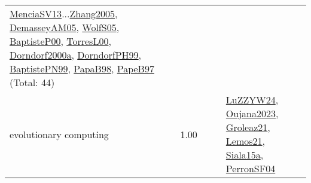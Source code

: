 {\begin{longtable}{p{3cm}r>{\raggedright\arraybackslash}p{6cm}>{\raggedright\arraybackslash}p{6cm}>{\raggedright\arraybackslash}p{8cm}}
\hyperref[detail:MenciaSV13]{MenciaSV13}...\hyperref[detail:Zhang2005]{Zhang2005}, \hyperref[detail:DemasseyAM05]{DemasseyAM05}, \hyperref[detail:WolfS05]{WolfS05}, \hyperref[detail:BaptisteP00]{BaptisteP00}, \hyperref[detail:TorresL00]{TorresL00}, \hyperref[detail:Dorndorf2000a]{Dorndorf2000a}, \hyperref[detail:DorndorfPH99]{DorndorfPH99}, \hyperref[detail:BaptistePN99]{BaptistePN99}, \hyperref[detail:PapaB98]{PapaB98}, \hyperref[detail:PapeB97]{PapeB97} (Total: 44)\\
\index{evolutionary computing}\index{Algorithms!evolutionary computing}evolutionary computing &  1.00 &  &  & \hyperref[detail:LuZZYW24]{LuZZYW24}, \hyperref[detail:Oujana2023]{Oujana2023}, \hyperref[detail:Groleaz21]{Groleaz21}, \hyperref[detail:Lemos21]{Lemos21}, \hyperref[detail:Siala15a]{Siala15a}, \hyperref[detail:PerronSF04]{PerronSF04}\\

\end{longtable}}
